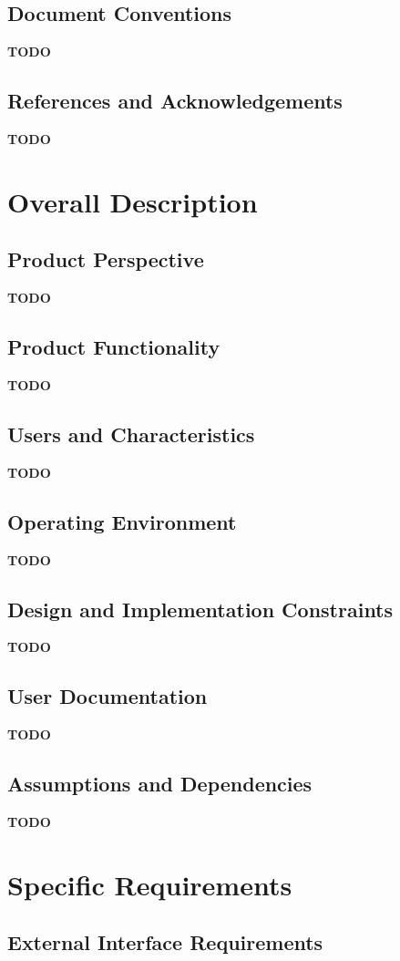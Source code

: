 \documentclass{article}
\newcommand{\todo}{{\LARGE\color{red}\textbf{TODO}}}
\begin{document}
    \subsection{Document Conventions}
        \todo
    \subsection{References and Acknowledgements}
        \todo

\pagebreak
\section{Overall Description}
    \subsection{Product Perspective}
        \todo
    \subsection{Product Functionality}
        \todo
    \subsection{Users and Characteristics}
        \todo
    \subsection{Operating Environment}
        \todo
    \subsection{Design and Implementation Constraints}
        \todo
    \subsection{User Documentation}
        \todo
    \subsection{Assumptions and Dependencies}
        \todo
\pagebreak
\section{Specific Requirements}
    \subsection{External Interface Requirements}
\end{document}
